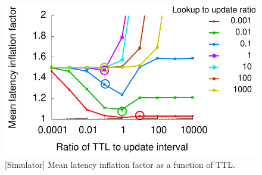 




\begin{figure}[t]
\centering
\includegraphics[scale=0.5]{graph/ttl.pdf}
\vspace{-0.1in}
\caption{[Simulator] Mean latency inflation factor as a function of TTL.}
\label{fig:meanlatencyinflationfactor}
\vspace{-0.1in}
\end{figure}

